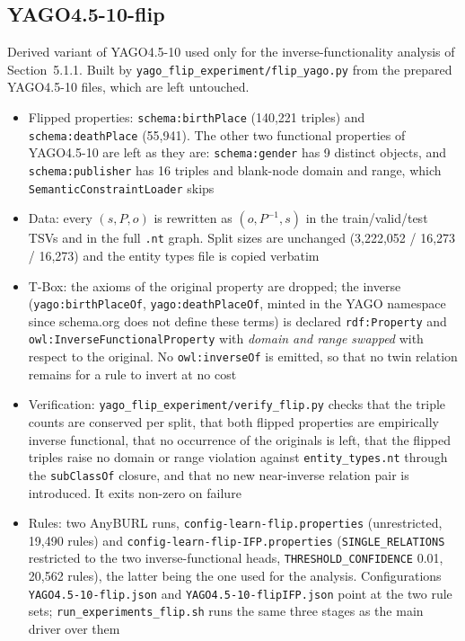 \documentclass[runningheads]{llncs}
\begin{document}
\subsection*{YAGO4.5-10-flip}
Derived variant of YAGO4.5-10 used only for the inverse-functionality analysis of
Section~5.1.1. Built by \texttt{yago\_flip\_experiment/flip\_yago.py} from the prepared
YAGO4.5-10 files, which are left untouched.
\begin{itemize}
    \item Flipped properties: \texttt{schema:birthPlace} (140,221 triples) and
    \texttt{schema:deathPlace} (55,941). The other two functional properties of YAGO4.5-10 are
    left as they are: \texttt{schema:gender} has 9 distinct objects, and \texttt{schema:publisher}
    has 16 triples and blank-node domain and range, which \texttt{SemanticConstraintLoader} skips
    \item Data: every $(s,P,o)$ is rewritten as $(o,P^{-1},s)$ in the train/valid/test TSVs and in
    the full \texttt{.nt} graph. Split sizes are unchanged (3,222,052 / 16,273 / 16,273) and the
    entity types file is copied verbatim
    \item T-Box: the axioms of the original property are dropped; the inverse
    (\texttt{yago:birthPlaceOf}, \texttt{yago:deathPlaceOf}, minted in the YAGO namespace since
    schema.org does not define these terms) is declared \texttt{rdf:Property} and
    \texttt{owl:InverseFunctionalProperty} with \emph{domain and range swapped} with respect to the
    original. No \texttt{owl:inverseOf} is emitted, so that no twin relation remains for a rule to
    invert at no cost
    \item Verification: \texttt{yago\_flip\_experiment/verify\_flip.py} checks that the triple
    counts are conserved per split, that both flipped properties are empirically inverse functional,
    that no occurrence of the originals is left, that the flipped triples raise no domain or range
    violation against \texttt{entity\_types.nt} through the \texttt{subClassOf} closure, and that no
    new near-inverse relation pair is introduced. It exits non-zero on failure
    \item Rules: two AnyBURL runs, \texttt{config-learn-flip.properties} (unrestricted, 19,490
    rules) and \texttt{config-learn-flip-IFP.properties} (\texttt{SINGLE\_RELATIONS} restricted to
    the two inverse-functional heads, \texttt{THRESHOLD\_CONFIDENCE} 0.01, 20,562 rules), the latter
    being the one used for the analysis. Configurations
    \texttt{YAGO4.5-10-flip.json} and \texttt{YAGO4.5-10-flipIFP.json} point at the two rule sets;
    \texttt{run\_experiments\_flip.sh} runs the same three stages as the main driver over them
\end{itemize}
\end{document}
